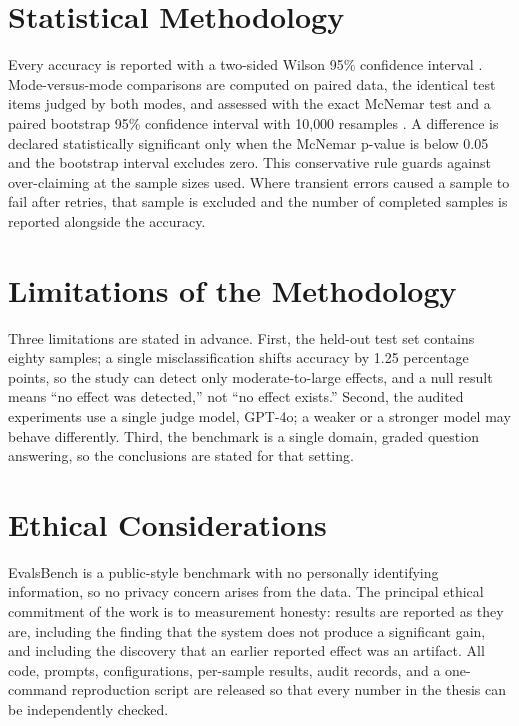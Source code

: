 \documentclass[14pt,a4paper]{extreport}
\begin{document}
\section{Statistical Methodology}

Every accuracy is reported with a two-sided Wilson 95\% confidence interval \cite{wilson1927}. Mode-versus-mode comparisons are computed on paired data, the identical test items judged by both modes, and assessed with the exact McNemar test \cite{mcnemar1947} and a paired bootstrap 95\% confidence interval with 10{,}000 resamples \cite{bootstrap1993}. A difference is declared statistically significant only when the McNemar p-value is below 0.05 and the bootstrap interval excludes zero. This conservative rule guards against over-claiming at the sample sizes used. Where transient errors caused a sample to fail after retries, that sample is excluded and the number of completed samples is reported alongside the accuracy.

\section{Limitations of the Methodology}

Three limitations are stated in advance. First, the held-out test set contains eighty samples; a single misclassification shifts accuracy by 1.25 percentage points, so the study can detect only moderate-to-large effects, and a null result means ``no effect was detected,'' not ``no effect exists.'' Second, the audited experiments use a single judge model, GPT-4o; a weaker or a stronger model may behave differently. Third, the benchmark is a single domain, graded question answering, so the conclusions are stated for that setting.

\section{Ethical Considerations}

EvalsBench is a public-style benchmark with no personally identifying information, so no privacy concern arises from the data. The principal ethical commitment of the work is to measurement honesty: results are reported as they are, including the finding that the system does not produce a significant gain, and including the discovery that an earlier reported effect was an artifact. All code, prompts, configurations, per-sample results, audit records, and a one-command reproduction script are released so that every number in the thesis can be independently checked.
\end{document}
